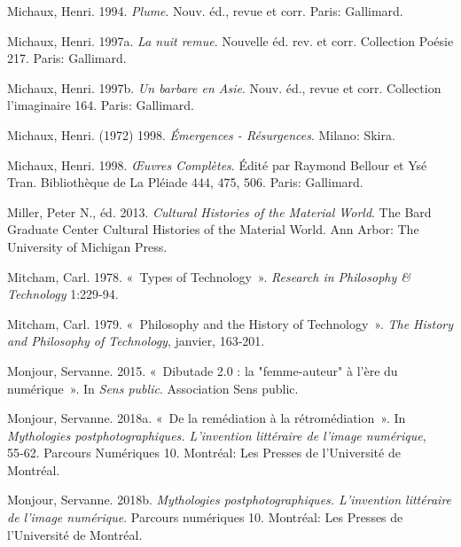 \begin{CSLReferences}{1}{0}
\leavevmode{}%
Michaux, Henri. 1994. \emph{{Plume}}. Nouv. {é}d., revue et corr.
{Paris}: {Gallimard}.

\leavevmode{}%
Michaux, Henri. 1997a. \emph{{La nuit remue}}. Nouvelle {é}d. rev. et
corr. {Collection Po{é}sie} 217. {Paris}: {Gallimard}.

\leavevmode{}%
Michaux, Henri. 1997b. \emph{{Un barbare en Asie}}. Nouv. {é}d., revue
et corr. {Collection l'imaginaire} 164. {Paris}: {Gallimard}.

\leavevmode{}%
Michaux, Henri. (1972) 1998. \emph{{É}mergences - {R{é}surgences}}.
{Milano}: {Skira}.

\leavevmode{}%
Michaux, Henri. 1998. \emph{{Œ}uvres Compl{è}tes}. Édité par Raymond
Bellour et Ysé Tran. Biblioth{è}que de La {Pl{é}iade} 444, 475, 506.
{Paris}: {Gallimard}.

\leavevmode{}%
Miller, Peter N., éd. 2013. \emph{Cultural {Histories} of the {Material
World}}. The {Bard Graduate Center Cultural Histories} of the {Material
World}. {Ann Arbor}: {The University of Michigan Press}.

\leavevmode{}%
Mitcham, Carl. 1978. {«~Types of {Technology}~»}. \emph{Research in
Philosophy \& Technology} 1:229‑94.

\leavevmode{}%
Mitcham, Carl. 1979. {«~Philosophy and the {History} of {Technology}~»}.
\emph{The History and Philosophy of Technology}, janvier, 163‑201.

\leavevmode{}%
Monjour, Servanne. 2015. {«~{Dibutade 2.0 : la "femme-auteur" {à}
l'{è}re du num{é}rique}~»}. In \emph{{Sens public}}. {Association Sens
public}.

\leavevmode{}%
Monjour, Servanne. 2018a. {«~{De la rem{é}diation {à} la
r{é}trom{é}diation}~»}. In \emph{{Mythologies postphotographiques.
L'invention litt{é}raire de l'image num{é}rique}}, 55‑62. {Parcours
Num{é}riques} 10. {Montr{é}al}: {Les Presses de l'Universit{é} de
Montr{é}al}.

\leavevmode{}%
Monjour, Servanne. 2018b. \emph{{Mythologies postphotographiques.
L'invention litt{é}raire de l'image num{é}rique}}. {Parcours
num{é}riques} 10. {Montr{é}al}: {Les Presses de l'Universit{é} de
Montr{é}al}.


\end{CSLReferences}
